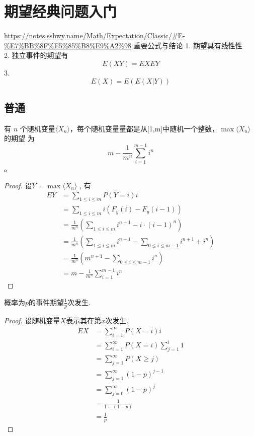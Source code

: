 \section{期望经典问题入门}
\url{https://notes.sshwy.name/Math/Expectation/Classic/#E-%E7%BB%8F%E5%85%B8%E9%A2%98}
重要公式与结论
1. 期望具有线性性\\
2. 独立事件的期望有
$$
E(XY)=EXEY
$$
3.
$$
E(X)=E(E(X|Y))
$$
\subsection{普通}
\begin{proposition}
  有 $n$ 个随机变量$\langle X_n \rangle$，每个随机变量量都是从[1,m]中随机一个整数，$\max{\langle X_n \rangle}$的期望
  为
  $$
  m-\frac{1}{m^n}\sum_{i=1}^{m-1}i^{n}
  $$。
\end{proposition}

\begin{proof}
  设$Y=\max{\langle X_n \rangle}$ , 有
  $$
  \begin{aligned}
    EY&=\sum_{1\le i \le m} P(Y=i)i\\
    &=\sum_{1\le i\le m} i(F_y(i)-F_y(i-1))\\
    &=\frac{1}{m^n}\left( \sum_{1\le i\le m} i^{n+1}-i\cdot (i-1)^{n}\right) \\
    &=\frac{1}{m^n}\left( \sum_{1\le i\le m} i^{n+1}-\sum_{0\le i\le m-1} i^{n+1} +i^{n}\right)\\
    &=\frac{1}{m^n}\left( m^{n+1}-\sum_{0\le i\le m-1}i^{n}\right)\\
    &=m-\frac{1}{m^n}\sum_{i=1}^{m-1}i^{n}
  \end{aligned}
  $$
\end{proof}

\begin{proposition}
  概率为$p$的事件期望$\frac{1}{p}$次发生.
\end{proposition}
\begin{proof}
  设随机变量$X$表示其在第$x$次发生. 
  $$
  \begin{aligned}
    EX&=\sum_{i=1}^{\infty} P(X=i)i\\
      &=\sum_{i=1}^{\infty} P(X=i) \sum_{j=1}^{i} 1\\
      &=\sum_{j=1}^{\infty} P(X\ge j)\\
      &=\sum_{j=1}^{\infty} (1-p)^{j-1}\\
      &=\sum_{j=0}^{\infty} (1-p)^j\\
      &=\frac{1}{1-(1-p)}\\
      &=\frac{1}{p}
  \end{aligned}
  $$
\end{proof}

